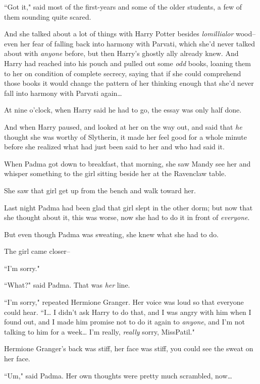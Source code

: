 ``Got it," said most of the first-years and some of the older students, a few of them sounding quite scared.

\later

And she talked about a lot of things with Harry Potter besides \emph{lomillialor} wood\---even her fear of falling back into harmony with Parvati, which she'd never talked about with \emph{anyone} before, but then Harry's ghostly ally already knew. And Harry had reached into his pouch and pulled out some \emph{odd} books, loaning them to her on condition of complete secrecy, saying that if she could comprehend those books it would change the pattern of her thinking enough that she'd never fall into harmony with Parvati again{\ldots}

At nine o'clock, when Harry said he had to go, the essay was only half done.

And when Harry paused, and looked at her on the way out, and said that \emph{he} thought she was worthy of Slytherin, it made her feel good for a whole minute before she realized what had just been said to her and who had said it.

\later

When Padma got down to breakfast, that morning, she saw Mandy see her and whisper something to the girl sitting beside her at the Ravenclaw table.

She saw that girl get up from the bench and walk toward her.

Last night Padma had been glad that girl slept in the other dorm; but now that she thought about it, this was worse, now she had to do it in front of \emph{everyone}.

But even though Padma was sweating, she knew what she had to do.

The girl came closer\---

``I'm sorry."

``What?" said Padma. That was \emph{her} line.

``I'm sorry," repeated Hermione Granger. Her voice was loud so that everyone could hear. ``I{\ldots} I didn't ask Harry to do that, and I was angry with him when I found out, and I made him promise not to do it again to \emph{anyone}, and I'm not talking to him for a week{\ldots} I'm really, \emph{really} sorry, Miss\?Patil."

Hermione Granger's back was stiff, her face was stiff, you could see the sweat on her face.

``Um," said Padma. Her own thoughts were pretty much scrambled, now{\ldots}

